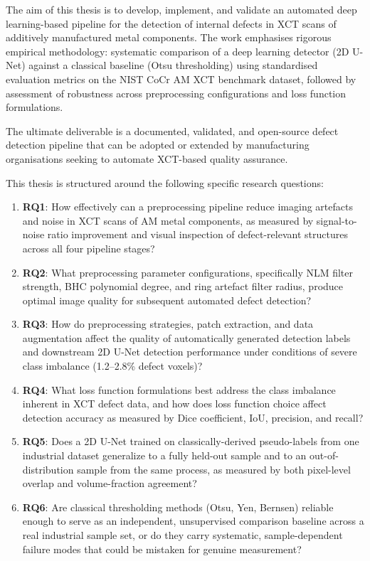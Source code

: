 The aim of this thesis is to develop, implement, and validate an automated deep learning-based
pipeline for the detection of internal defects in XCT scans of additively manufactured metal
components. The work emphasises rigorous empirical methodology: systematic comparison of a deep
learning detector (2D U-Net) against a classical baseline (Otsu thresholding) using standardised
evaluation metrics on the NIST CoCr AM XCT benchmark dataset, followed by assessment of robustness
across preprocessing configurations and loss function formulations.

The ultimate deliverable is a documented, validated, and open-source defect detection pipeline that
can be adopted or extended by manufacturing organisations seeking to automate XCT-based quality
assurance.

This thesis is structured around the following specific research questions:
\begin{enumerate}
\item \textbf{RQ1}: How effectively can a preprocessing pipeline reduce imaging artefacts and noise
  in XCT scans of AM metal components, as measured by signal-to-noise ratio improvement and visual
  inspection of defect-relevant structures across all four pipeline stages?
\item \textbf{RQ2}: What preprocessing parameter configurations, specifically NLM filter strength,
  BHC polynomial degree, and ring artefact filter radius, produce optimal image quality for
  subsequent automated defect detection?
\item \textbf{RQ3}: How do preprocessing strategies, patch extraction, and data augmentation affect
  the quality of automatically generated detection labels and downstream 2D U-Net detection
  performance under conditions of severe class imbalance (1.2--2.8\% defect voxels)?
\item \textbf{RQ4}: What loss function formulations best address the class imbalance inherent in XCT
  defect data, and how does loss function choice affect detection accuracy as measured by Dice
  coefficient, IoU, precision, and recall?
\item \textbf{RQ5}: Does a 2D U-Net trained on classically-derived pseudo-labels from one industrial
  dataset generalize to a fully held-out sample and to an out-of-distribution sample from the same
  process, as measured by both pixel-level overlap and volume-fraction agreement?
\item \textbf{RQ6}: Are classical thresholding methods (Otsu, Yen, Bernsen) reliable enough to serve
  as an independent, unsupervised comparison baseline across a real industrial sample set, or do they
  carry systematic, sample-dependent failure modes that could be mistaken for genuine measurement?
\end{enumerate}

